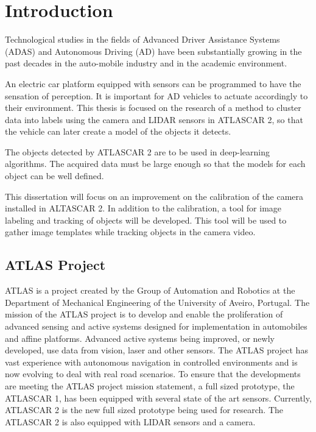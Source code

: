 \chapter{Introduction}
Technological studies in the fields of Advanced Driver Assistance Systems (ADAS) and Autonomous Driving (AD) have been substantially growing in the past decades in the auto-mobile industry and in the academic environment. 

An electric car platform equipped with sensors can be programmed to have the sensation of perception. It is important for AD vehicles to actuate accordingly to their environment. This thesis is focused on the research of a method to cluster data into labels using the camera and LIDAR sensors in ATLASCAR 2, so that the vehicle can later create a model of the objects it detects.

The objects detected by ATLASCAR 2 are to be used in deep-learning algorithms. The acquired data must be large enough so that the models for each object can be well defined.

This dissertation will focus on an improvement on the calibration of the camera installed in ALTASCAR 2. In addition to the calibration, a tool for image labeling and tracking of objects will be developed. This tool will be used to gather image templates while tracking objects in the camera video. 

\section{ATLAS Project}

ATLAS is a project created by the Group of Automation and Robotics at the Department of Mechanical Engineering of the University of Aveiro, Portugal. The mission of the ATLAS project is to develop and enable the proliferation of advanced sensing and active systems designed for implementation in automobiles and affine platforms. Advanced active systems being improved, or newly developed, use data from vision, laser and other sensors. The ATLAS project has vast experience with autonomous navigation in controlled environments and is now evolving to deal with real road scenarios. To ensure that the developments are meeting the ATLAS project mission statement, a full sized prototype, the ATLASCAR 1, has been equipped with several state of the art sensors. \cite{LARlabs} Currently, ATLASCAR 2 is the new full sized prototype being used for research. The ATLASCAR 2 is also equipped with LIDAR sensors and a camera.

